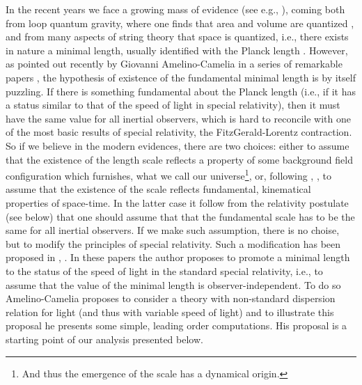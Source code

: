 \documentclass [11pt] {article}
\begin{document}
In the recent years we face a growing mass of evidence (see e.g., 
\cite{gara}), coming both from loop quantum gravity, where one finds that 
area and volume are quantized \cite{rovsmol}, and from many aspects of  
string theory that space is quantized, i.e., there exists in nature a 
minimal length, usually identified with the Planck length \coordHE{}. 
However, as pointed out recently by Giovanni Amelino-Camelia in a series of 
remarkable papers \cite{gac1}, \cite{gac2} the hypothesis of existence of 
the fundamental minimal length is by itself puzzling. If there is something 
fundamental about the Planck length  (i.e., if it has a status similar to 
that of the speed of light in special relativity), then it must have the 
same value for all inertial observers, which is hard to reconcile with one 
of the most basic results of special relativity, the FitzGerald-Lorentz 
contraction. So if we believe in the modern evidences, there are two 
choices: either to assume that the existence of the length scale reflects a 
property of some background field configuration which furnishes, what we 
call our universe\footnote{And thus the emergence of the scale has a 
dynamical origin.}, or, following \cite{gac1}, \cite{gac2}, to assume that 
the existence of the scale reflects  fundamental, kinematical properties of 
space-time. In the latter case it follow from the relativity postulate (see 
below) that one should assume that that the fundamental scale has to be the 
same for all inertial observers. If we make such assumption, there is no 
choise, but to modify the principles of special relativity. Such a 
modification has been proposed in \cite{gac1}, \cite{gac2}.   In these 
papers the author proposes to promote a minimal length to the status of the 
speed of light in the standard special relativity, i.e., to assume that the 
value of the minimal length is observer-independent. To do so 
Amelino-Camelia proposes to consider a theory with non-standard dispersion 
relation for light (and thus with variable speed of light) and to 
illustrate this proposal he presents some simple, leading order 
computations. His proposal is a starting point of our analysis presented 
below. 
\end{document}
